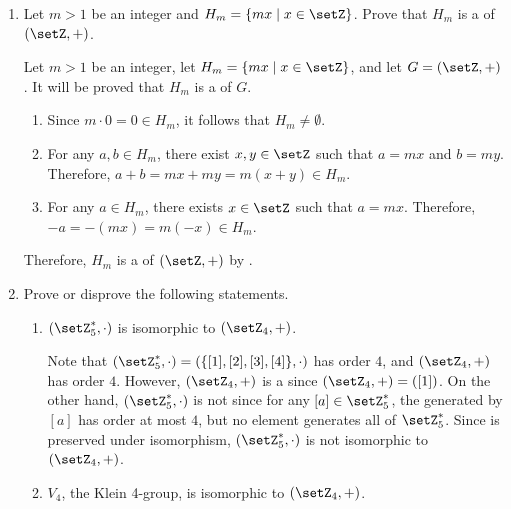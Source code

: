 \begin{enumerate}
\begin{subprove}
    Since isomorphism is transitive and \(G_{1} \simeq G_{2}\) and \(G_{2} \simeq G_{3}\), it follows that \(G_{1} \simeq G_{3}\). Therefore, the s \((\{-1, 1\}, \cdot), (\setZ_{2}, +), (\setZ_{3}^{*}, \cdot)\) are all pairwise isomorphic.
  \end{subprove}
  \item Let \(m > 1\) be an integer and \(H_{m} = \{m x \mid x \in \setZ\}\).
  Prove that \(H_{m}\) is a  of \((\setZ, +)\).
  \begin{subprove}
    Let \(m > 1\) be an integer, let \(H_{m} = \{m x \mid x \in \setZ\}\), and let \(G = (\setZ, +)\).
    It will be proved that \(H_{m}\) is a  of \(G\).
    \begin{enumerate}
      \item Since \(m \cdot 0 = 0 \in H_{m}\), it follows that \(H_{m} \neq \emptyset\).
      \item For any \(a, b \in H_{m}\), there exist \(x, y \in \setZ\) such that \(a = m x\) and \(b = m y\).
      Therefore, \(a + b = m x + m y = m(x + y) \in H_{m}\).
      \item For any \(a \in H_{m}\), there exists \(x \in \setZ\) such that \(a = m x\).
      Therefore, \(-a = -(m x) = m(-x) \in H_{m}\).
    \end{enumerate}
    Therefore, \(H_{m}\) is a  of \((\setZ, +)\)
    by .
  \end{subprove}
  \newpage
  \item Prove or disprove the following statements.
  \begin{enumerate}
    \item \((\setZ_{5}^{*}, \cdot)\) is isomorphic to \((\setZ_{4}, +)\).
    \begin{subdisprove}
      Note that \((\setZ_{5}^{*}, \cdot) = (\{[1], [2], [3], [4]\}, \cdot)\) 
      has order \(4\), 
      and \((\setZ_{4}, +)\) has order \(4\).
      However, \((\setZ_{4}, +)\) is a  since \((\setZ_{4}, +) = ([1])\).
      On the other hand, \((\setZ_{5}^{*}, \cdot)\) is not  since for any \([a] \in \setZ_{5}^{*}\), the  generated by \([a]\) has order at most \(4\), but no element generates all of \(\setZ_{5}^{*}\).
      Since  is preserved under isomorphism, \((\setZ_{5}^{*}, \cdot)\) is not isomorphic to \((\setZ_{4}, +)\).
    \end{subdisprove}
    \item \(V_{4}\), the Klein 4-group, is isomorphic to \((\setZ_{4}, +)\).

\end{enumerate}
\end{enumerate}
